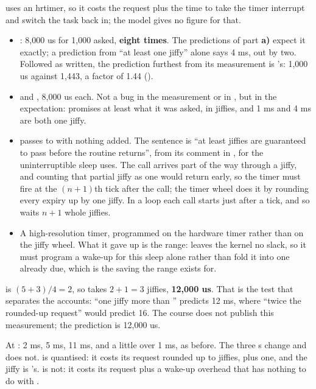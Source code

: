 \noindent {} uses an hrtimer, so it costs the request plus the time to take the
timer interrupt and switch the task back in; the model gives no figure for that.

\begin{itemize}
  \item {}: 8,000 us for 1,000 asked, \textbf{eight times}. The predictions of part
    \textbf{a)} expect it exactly; a prediction from ``at least one jiffy'' alone says 4 ms, out by
    two. Followed as written, the prediction furthest from its measurement is
    's: 1,000 us against 1,443, a factor of 1.44 ().
  \item {} and , 8,000 us each. Not a bug in the measurement or in
    , but in the expectation:  promises at least what it was asked, in
    jiffies, and 1 ms and 4 ms are both one jiffy.
  \item {} passes  to  with nothing
    added. The sentence is ``at least  jiffies are guaranteed to pass before the
    routine returns'', from its comment in , for the uninterruptible
    sleep  uses. The call arrives part of the way through a jiffy, and counting that
    partial jiffy as one would return early, so the timer must fire at the $(n + 1)$th tick after
    the call; the timer wheel does it by rounding every expiry up by one jiffy. In a loop each call
    starts just after a tick, and so waits $n + 1$ whole jiffies.
  \item A high-resolution timer, programmed on the hardware timer rather than on the jiffy wheel.
    What it gave up is the range:  leaves the kernel no slack, so it
    must program a wake-up for this sleep alone rather than fold it into one already due, which is
    the saving the range exists for.
\end{itemize}

  is $(5 + 3)/4 = 2$, so  takes $2 + 1 = 3$
jiffies, \textbf{12,000 us}. That is the test that separates the accounts: ``one jiffy more than
'' predicts 12 ms, where ``twice the rounded-up request'' would predict 16.
The course does not publish this measurement; the prediction is 12,000 us.

 At :  2 ms,  5 ms,  11 ms,
and  a little over 1 ms, as before. The three s change
and  does not.  is quantised: it costs its request rounded up to
jiffies, plus one, and the jiffy is 's.  is not: it costs its request
plus a wake-up overhead that has nothing to do with .

